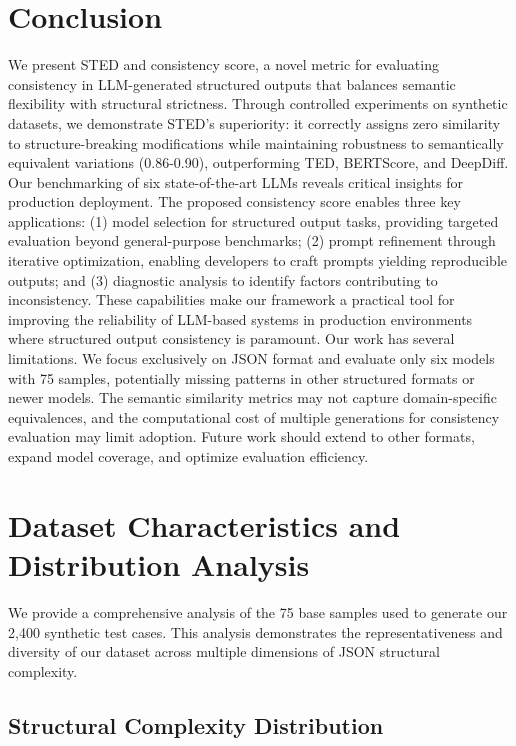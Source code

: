 \documentclass{article}
\begin{document}
\section{Conclusion}
We present STED and consistency score, a novel metric for evaluating consistency in LLM-generated structured outputs that balances semantic flexibility with structural strictness. Through controlled experiments on synthetic datasets, we demonstrate STED's superiority: it correctly assigns zero similarity to structure-breaking modifications while maintaining robustness to semantically equivalent variations (0.86-0.90), outperforming TED, BERTScore, and DeepDiff.
Our benchmarking of six state-of-the-art LLMs reveals critical insights for production deployment. The proposed consistency score enables three key applications: (1) model selection for structured output tasks, providing targeted evaluation beyond general-purpose benchmarks; (2) prompt refinement through iterative optimization, enabling developers to craft prompts yielding reproducible outputs; and (3) diagnostic analysis to identify factors contributing to inconsistency. These capabilities make our framework a practical tool for improving the reliability of LLM-based systems in production environments where structured output consistency is paramount.
Our work has several limitations. We focus exclusively on JSON format and evaluate only six models with 75 samples, potentially missing patterns in other structured formats or newer models. The semantic similarity metrics may not capture domain-specific equivalences, and the computational cost of multiple generations for consistency evaluation may limit adoption. Future work should extend to other formats, expand model coverage, and optimize evaluation efficiency.




\appendix
\section{Dataset Characteristics and Distribution Analysis}
\label{sec:dataset-distribution}

We provide a comprehensive analysis of the 75 base samples used to generate our 2,400 synthetic test cases. This analysis demonstrates the representativeness and diversity of our dataset across multiple dimensions of JSON structural complexity.

\subsection{Structural Complexity Distribution}
\label{subsec:structural-complexity}
\end{document}
